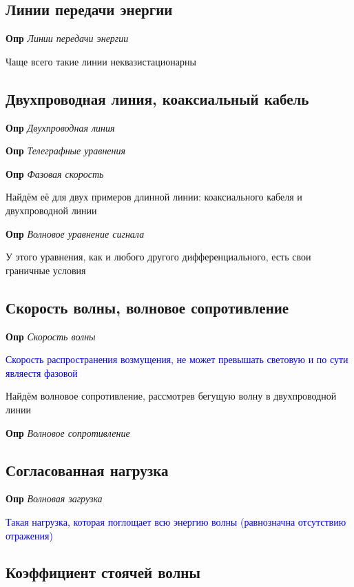 \documentclass[a4paper, 14pt]{article}
\begin{document}
    \subsection{Линии передачи энергии}
    
    \textbf{Опр} \textit{Линии передачи энергии}
    
    Чаще всего такие линии неквазистационарны
    
    \subsection{Двухпроводная линия, коаксиальный кабель}
    
    \textbf{Опр} \textit{Двухпроводная линия}
    
    \textbf{Опр} \textit{Телеграфные уравнения}
    
    \textbf{Опр} \textit{Фазовая скорость}
    
    Найдём её для двух примеров длинной линии: коаксиального кабеля и двухпроводной линии
    
    \textbf{Опр} \textit{Волновое уравнение сигнала}
    
    У этого уравнения, как и любого другого дифференциального, есть свои граничные условия
    
    \subsection{Скорость волны, волновое сопротивление}
    
    \textbf{Опр} \textit{Скорость волны}
    
    \textcolor{blue}{Скорость распространения возмущения, не может превышать световую и по сути являестя фазовой}
    
    Найдём волновое сопротивление, рассмотрев бегущую волну в двухпроводной линии
    
    \textbf{Опр} \textit{Волновое сопротивление}
    
    \subsection{Согласованная нагрузка}
    
    \textbf{Опр} \textit{Волновая загрузка}
    
    \textcolor{blue}{Такая нагрузка, которая поглощает всю энергию волны (равнозначна отсутствию отражения)}
    
    \subsection{Коэффициент стоячей волны}
    
\end{document}
